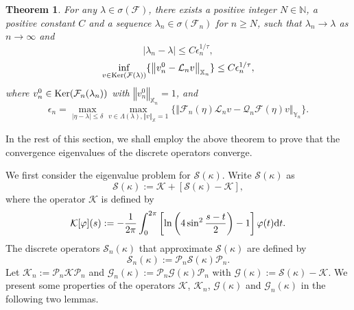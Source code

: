 \documentclass{article}
\newtheorem{theorem}{Theorem}[section]
\newcommand{\abs}[1]{\left\vert#1\right\vert}
\newcommand{\norm}[1]{\left\Vert#1\right\Vert}
\begin{document}
	\begin{theorem}\label{sec3:thm0}
		For any $\lambda\in\sigma(\mathcal{F})$, there exists a positive integer $N\in\mathbb{N}$, a positive constant $C$ and a sequence $\lambda_n\in\sigma(\mathcal{F}_n)$ 
		for $n\geq N$, such that
		$\lambda_n\to\lambda$ as $n\to\infty$ and 
		\begin{equation*}
			\abs{\lambda_n-\lambda}\leq C\epsilon_n^{1/\tau},
		\end{equation*}
		\begin{equation*}
			\inf\limits_{v\in{\rm Ker}(\mathcal{F}(\lambda))}\{\norm{v_n^0-\mathcal{L}_nv}_{\mathbb{X}_n}\}\leq C \epsilon_n^{1/\tau},
		\end{equation*}
		where $v_n^0\in{\rm Ker}(\mathcal{F}_n(\lambda_n))$ with $\norm{v_n^0}_{\mathbb{X}_n}=1$, and 
		\begin{equation*}
			\epsilon_n=\max\limits_{\abs{\eta-\lambda}\leq\delta}\max\limits_{v\in\Lambda(\lambda),\norm{v}_{\mathbb{X}}=1}\{\norm{\mathcal{F}_n(\eta)\mathcal{L}_nv-\mathcal{Q}_n\mathcal{F}(\eta)v}_{\mathbb{Y}_n}\}.
		\end{equation*}	
	\end{theorem}	
	
	In the rest of this section, we shall employ the above theorem to prove that the convergence eigenvalues of the discrete operators converge. 
	
	We first consider the eigenvalue problem for $\mathcal{S}(\kappa)$.
	Write  $\mathcal{S}(\kappa)$ as
	\begin{equation*}\label{eq:1thm1}
		\mathcal{S}(\kappa):=\mathcal{K}+[\mathcal{S}(\kappa)-\mathcal{K}],
	\end{equation*}
	where the operator $\mathcal{K}$ is defined by
	\begin{equation*}\label{operator_K}
		\mathcal{K}[\varphi](s):=-\dfrac{1}{2\pi}\int_0^{2\pi}
		\left[\ln{\left(4\sin^2\dfrac{s-t}{2}\right)}-1\right]\varphi(t){\rm d}t.
	\end{equation*}
	The discrete operators $\mathcal{S}_n(\kappa)$ that approximate $\mathcal{S}(\kappa)$ are defined by
	\begin{equation}\label{SnKappa}
		\mathcal{S}_n(\kappa):=\mathcal{P}_n\mathcal{S}(\kappa)\mathcal{P}_n.
	\end{equation} 
	Let $\mathcal{K}_n:=\mathcal{P}_n\mathcal{K}\mathcal{P}_n$ and $\mathcal{G}_n(\kappa):=\mathcal{P}_n\mathcal{G}(\kappa)\mathcal{P}_n$ with $\mathcal{G}(\kappa):=\mathcal{S}(\kappa)-\mathcal{K}$. We present some properties of the operators $\mathcal{K}$, $\mathcal{K}_n$,  $\mathcal{G}(\kappa)$ and $\mathcal{G}_n(\kappa)$ in the following two lemmas.
	
\end{document}
